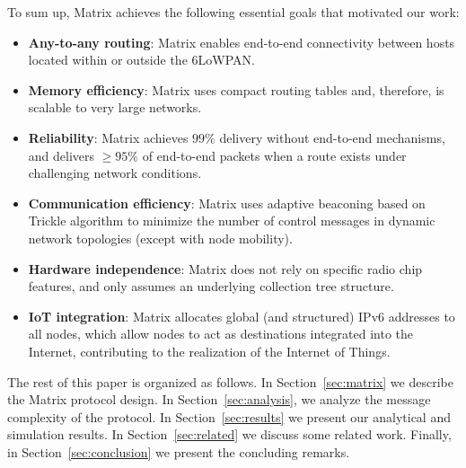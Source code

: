 To sum up, Matrix achieves the following essential goals that motivated our work:
\begin{itemize}
  \item \textbf{Any-to-any routing}: Matrix enables end-to-end connectivity
  between hosts located within or outside the 6LoWPAN.%
  \item \textbf{Memory efficiency}: Matrix uses compact routing tables and,
  therefore, is scalable to very large networks.
  \item \textbf{Reliability}: Matrix achieves $99\%$ delivery
  without end-to-end mechanisms, and delivers $\geq 95\%$ of
  end-to-end packets when a route exists under challenging network conditions.
  \item \textbf{Communication efficiency}: Matrix uses adaptive beaconing based
  on Trickle algorithm \cite{Levis:2004} to minimize the number of control
  messages in dynamic network topologies (except with node mobility).
  \item \textbf{Hardware independence}: Matrix does not rely on specific radio
  chip features, and only assumes an underlying collection tree structure.
  \item \textbf{IoT integration}: Matrix allocates global (and structured) IPv6
addresses to all nodes, which allow nodes to act as destinations integrated into
the Internet, contributing to the realization of the Internet of Things.
\end{itemize}


The rest of this paper is organized as follows. In
Section~\ref{sec:matrix} we describe the Matrix protocol design. In
Section~\ref{sec:analysis}, we analyze the message complexity of the protocol.
In Section~\ref{sec:results} we present our analytical and simulation results.
In Section~\ref{sec:related} we discuss some related work. Finally, in Section~\ref{sec:conclusion} we present the concluding remarks.
